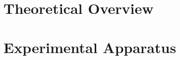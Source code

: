 \documentclass[edeposit,fullpage]{uiucthesis2009}
\begin{document}
\chapter{Theoretical Overview}


\chapter{Experimental Apparatus}

\end{document}
